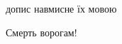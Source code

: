 \begin{itemize}
\begin{itemize}
допис навмисне їх мовою
\end{itemize}

 
Смерть ворогам!

\end{itemize}

